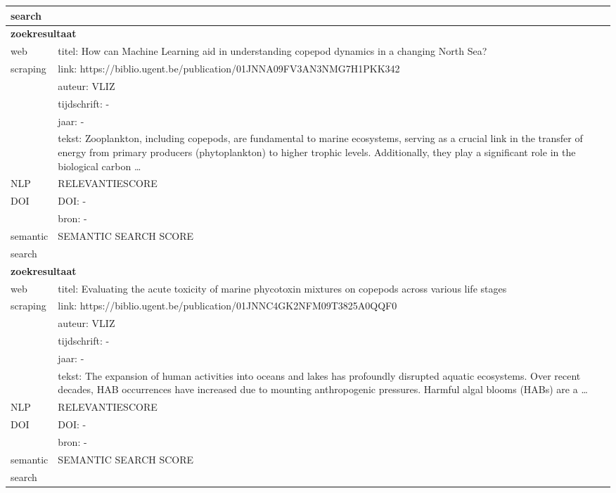 \begin{table}[h!]
\begin{tabularx}{\textwidth}{|p{4cm}|X|}
        search&\\
        \hline
        \multicolumn{2}{|X|}{\textbf{zoekresultaat}} \\
        \hline
        web &titel: How can Machine Learning aid in understanding copepod dynamics in a changing North Sea?\\
        scraping&link: https://biblio.ugent.be/publication/01JNNA09FV3AN3NMG7H1PKK342\\
        &auteur: VLIZ\\
        &tijdschrift: -\\
        &jaar: -\\
        &tekst: Zooplankton, including copepods, are fundamental to marine ecosystems, serving as a crucial link in the transfer of energy from primary producers (phytoplankton) to higher trophic levels. Additionally, they play a significant role in the biological carbon …\\
        \hline
        NLP&RELEVANTIESCORE\\
        \hline
        DOI&DOI: -\\
        &bron: -\\
        \hline
        semantic&SEMANTIC SEARCH SCORE\\
        search&\\
        \hline
        \multicolumn{2}{|X|}{\textbf{zoekresultaat}} \\
        \hline
        web &titel: Evaluating the acute toxicity of marine phycotoxin mixtures on copepods across various life stages\\
        scraping&link: https://biblio.ugent.be/publication/01JNNC4GK2NFM09T3825A0QQF0\\
        &auteur: VLIZ\\
        &tijdschrift: -\\
        &jaar: -\\
        &tekst: The expansion of human activities into oceans and lakes has profoundly disrupted aquatic ecosystems. Over recent decades, HAB occurrences have increased due to mounting anthropogenic pressures. Harmful algal blooms (HABs) are a …\\
        \hline
        NLP&RELEVANTIESCORE\\
        \hline
        DOI&DOI: -\\
        &bron: -\\
        \hline
        semantic&SEMANTIC SEARCH SCORE\\
        search&\\

\end{tabularx}
\end{table}
